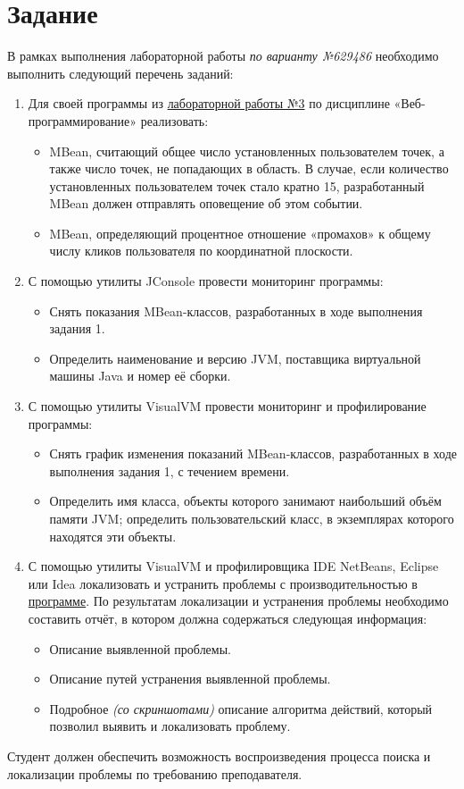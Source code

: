 \section{Задание}

В рамках выполнения лабораторной работы \textit{по варианту №629486} необходимо выполнить следующий перечень заданий:
\begin{enumerate}
  \item Для своей программы из \href{https://github.com/aaalvaaas/web3}{лабораторной работы №3} по дисциплине «Веб-программирование» реализовать:
  \begin{itemize}
    \item MBean, считающий общее число установленных пользователем точек, а также число точек, не попадающих в область. В случае, если количество установленных пользователем точек стало кратно 15, разработанный MBean должен отправлять оповещение об этом событии.
    \item MBean, определяющий процентное отношение «промахов» к общему числу кликов пользователя по координатной плоскости.
  \end{itemize}
  \item С помощью утилиты JConsole провести мониторинг программы:
  \begin{itemize}
    \item Снять показания MBean-классов, разработанных в ходе выполнения задания 1.
    \item Определить наименование и версию JVM, поставщика виртуальной машины Java и номер её сборки.
  \end{itemize}
  \item С помощью утилиты VisualVM провести мониторинг и профилирование программы:
  \begin{itemize}
    \item Снять график изменения показаний MBean-классов, разработанных в ходе выполнения задания 1, с течением времени.
    \item Определить имя класса, объекты которого занимают наибольший объём памяти JVM; определить пользовательский класс, в экземплярах которого находятся эти объекты.
  \end{itemize}
  \item С помощью утилиты VisualVM и профилировщика IDE NetBeans, Eclipse или Idea локализовать и устранить проблемы с производительностью в \href{https://github.com/itmo-fse-ld-2026/4-performance/tree/main/http-unit}{программе}. По результатам локализации и устранения проблемы необходимо составить отчёт, в котором должна содержаться следующая информация:
  \begin{itemize}
    \item Описание выявленной проблемы.
    \item Описание путей устранения выявленной проблемы.
    \item Подробное \textit{(со скриншотами)} описание алгоритма действий, который позволил выявить и локализовать проблему.
  \end{itemize}
\end{enumerate}

Студент должен обеспечить возможность воспроизведения процесса поиска и локализации проблемы по требованию преподавателя.